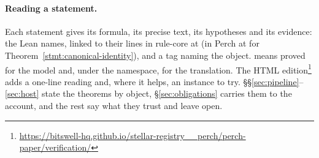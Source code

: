 \paragraph{Reading a statement.} Each statement gives its formula, its precise
text, its hypotheses and its evidence: the Lean names, linked to their lines in
rule-core at  (in Perch at  for
Theorem~\ref{stmt:canonical-identity}), and a tag naming the object.
 means proved for the model and, under the
 namespace, for the translation. The HTML
edition\footnote{\url{https://bitswell-hq.github.io/stellar-registry__perch/perch-paper/verification/}}
adds a one-line reading and, where it helps, an instance to try.
\S\S\ref{sec:pipeline}--\ref{sec:host} state the theorems by object,
\S\ref{sec:obligations} carries them to the account, and the rest say what they
trust and leave open.
